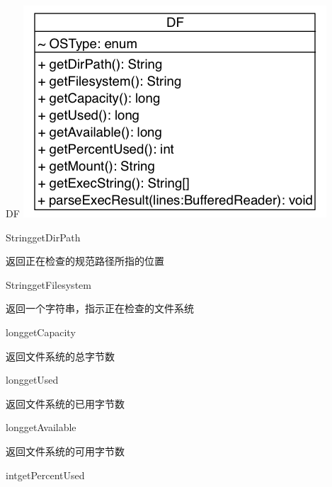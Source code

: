 \begin{XeClass}{DF}
\includegraphics[width=\textwidth]{cdig/DF.png}
    
    \begin{XeMethod}{\XePublic}{String}{getDirPath}
         
 返回正在检查的规范路径所指的位置

    \end{XeMethod}

    \begin{XeMethod}{\XePublic}{String}{getFilesystem}
         
 返回一个字符串，指示正在检查的文件系统

    \end{XeMethod}

    \begin{XeMethod}{\XePublic}{long}{getCapacity}
         
 返回文件系统的总字节数

    \end{XeMethod}

    \begin{XeMethod}{\XePublic}{long}{getUsed}
         
 返回文件系统的已用字节数

    \end{XeMethod}

    \begin{XeMethod}{\XePublic}{long}{getAvailable}
         
 返回文件系统的可用字节数

    \end{XeMethod}

    \begin{XeMethod}{\XePublic}{int}{getPercentUsed}
         

\end{XeMethod}
\end{XeClass}
